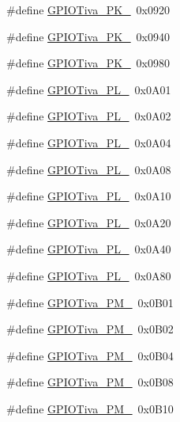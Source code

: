 \begin{DoxyCompactItemize}
\#define \hyperlink{_g_p_i_o_tiva_8h_a53091bec2b4fe741faf17420c065020c}{G\+P\+I\+O\+Tiva\+\_\+\+P\+K\+\_}~0x0920
\item 
\#define \hyperlink{_g_p_i_o_tiva_8h_aa3b48f107f5028cf9160eb4011ee4af0}{G\+P\+I\+O\+Tiva\+\_\+\+P\+K\+\_}~0x0940
\item 
\#define \hyperlink{_g_p_i_o_tiva_8h_a77d496ed5870c63578050c8471eb55e2}{G\+P\+I\+O\+Tiva\+\_\+\+P\+K\+\_}~0x0980
\item 
\#define \hyperlink{_g_p_i_o_tiva_8h_ae866fd87538cfc9db4ec7bfa07d69c06}{G\+P\+I\+O\+Tiva\+\_\+\+P\+L\+\_}~0x0\+A01
\item 
\#define \hyperlink{_g_p_i_o_tiva_8h_afea16a4593ff5bc64cfea74683a93ffb}{G\+P\+I\+O\+Tiva\+\_\+\+P\+L\+\_}~0x0\+A02
\item 
\#define \hyperlink{_g_p_i_o_tiva_8h_abaf465912bb12b981659898356d6fddc}{G\+P\+I\+O\+Tiva\+\_\+\+P\+L\+\_}~0x0\+A04
\item 
\#define \hyperlink{_g_p_i_o_tiva_8h_ad155145d198768f95f2b9c7b0fbc7444}{G\+P\+I\+O\+Tiva\+\_\+\+P\+L\+\_}~0x0\+A08
\item 
\#define \hyperlink{_g_p_i_o_tiva_8h_afbd8eee708ae60dd1a60482c868b54d6}{G\+P\+I\+O\+Tiva\+\_\+\+P\+L\+\_}~0x0\+A10
\item 
\#define \hyperlink{_g_p_i_o_tiva_8h_a29cb8055e04410ab3d47700e591c64b3}{G\+P\+I\+O\+Tiva\+\_\+\+P\+L\+\_}~0x0\+A20
\item 
\#define \hyperlink{_g_p_i_o_tiva_8h_abdf9fd390d402551205d5bb70c9e2404}{G\+P\+I\+O\+Tiva\+\_\+\+P\+L\+\_}~0x0\+A40
\item 
\#define \hyperlink{_g_p_i_o_tiva_8h_ae780d1c6337ae8f874419aee8082af96}{G\+P\+I\+O\+Tiva\+\_\+\+P\+L\+\_}~0x0\+A80
\item 
\#define \hyperlink{_g_p_i_o_tiva_8h_a0cb63a3fd78b659d460bfb0b9285089c}{G\+P\+I\+O\+Tiva\+\_\+\+P\+M\+\_}~0x0\+B01
\item 
\#define \hyperlink{_g_p_i_o_tiva_8h_abd92be7bc351c7946fde15e4ac3295ac}{G\+P\+I\+O\+Tiva\+\_\+\+P\+M\+\_}~0x0\+B02
\item 
\#define \hyperlink{_g_p_i_o_tiva_8h_ad991bf3e6e2663c1a762cd16be067361}{G\+P\+I\+O\+Tiva\+\_\+\+P\+M\+\_}~0x0\+B04
\item 
\#define \hyperlink{_g_p_i_o_tiva_8h_a26aafe29478b5b759c31e580d87a27bb}{G\+P\+I\+O\+Tiva\+\_\+\+P\+M\+\_}~0x0\+B08
\item 
\#define \hyperlink{_g_p_i_o_tiva_8h_a0f6720acb88a83eb4b6d7d2a6738e555}{G\+P\+I\+O\+Tiva\+\_\+\+P\+M\+\_}~0x0\+B10
\item 

\end{DoxyCompactItemize}
